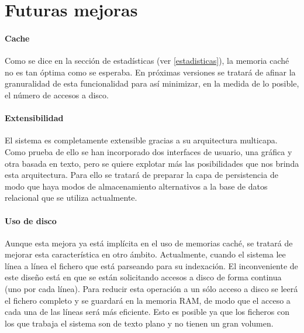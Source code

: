 \section{Futuras mejoras}

\paragraph{Cache} Como se dice en la sección de estadísticas (ver
\ref{estadisticas}), la memoria caché no es tan óptima como se
esperaba. En próximas versiones se tratará de afinar la granuralidad
de esta funcionalidad para así minimizar, en la medida de lo posible,
el número de accesos a disco.

\paragraph{Extensibilidad} El sistema es completamente extensible
gracias a su arquitectura multicapa. Como prueba de ello se han
incorporado dos interfaces de usuario, una gráfica y otra basada en
texto, pero se quiere explotar más las posibilidades que nos brinda
esta arquitectura. Para ello se tratará de preparar la capa de
persistencia de modo que haya modos de almacenamiento alternativos a
la base de datos relacional que se utiliza actualmente.

\paragraph{Uso de disco} Aunque esta mejora ya está implícita en el
uso de memorias caché, se tratará de mejorar esta característica en
otro ámbito. Actualmente, cuando el sistema lee línea a línea el
fichero que está parseando para su indexación. El inconveniente de
este diseño está en que se están solicitando accesos a disco de forma
continua (uno por cada línea). Para reducir esta operación a un sólo
acceso a disco se leerá el fichero completo y se guardará en la
memoria RAM, de modo que el acceso a cada una de las líneas será más
eficiente. Esto es posible ya que los ficheros con los que trabaja el
sistema son de texto plano y no tienen un gran volumen.
